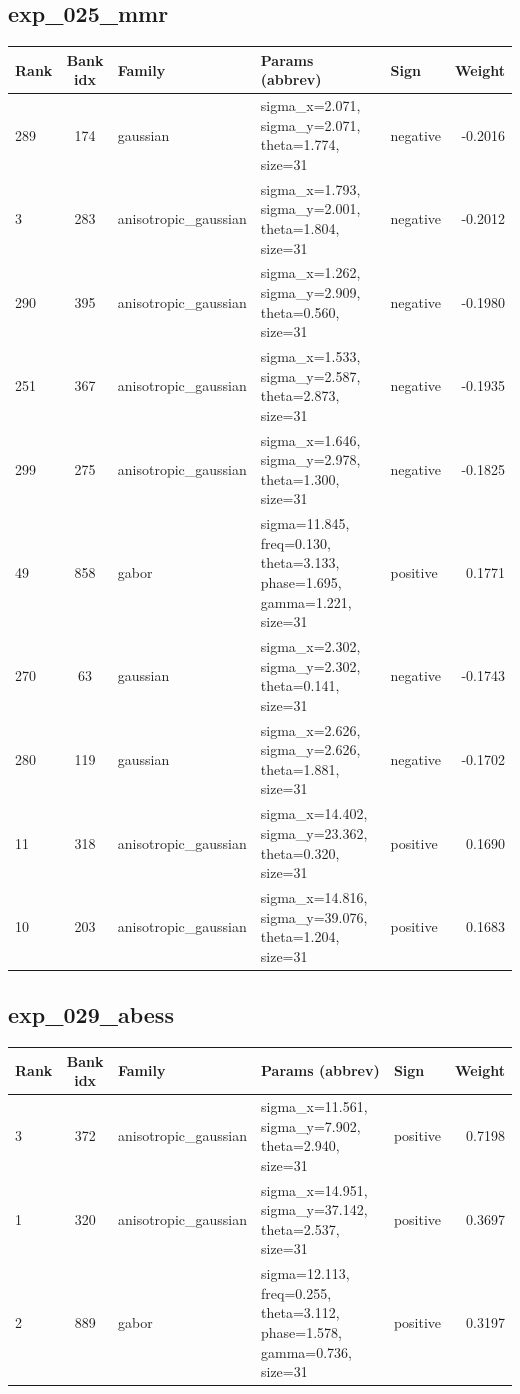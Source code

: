 \documentclass{article}
\begin{document}
\subsection*{exp\_025\_mmr}
\begin{center}
\begin{tabular}{lclllr}
\toprule
Rank & Bank idx & Family & Params (abbrev) & Sign & Weight \\
\midrule

289 & 174 & gaussian & sigma\_x=2.071, sigma\_y=2.071, theta=1.774, size=31 & negative & -0.2016 \\
3 & 283 & anisotropic\_gaussian & sigma\_x=1.793, sigma\_y=2.001, theta=1.804, size=31 & negative & -0.2012 \\
290 & 395 & anisotropic\_gaussian & sigma\_x=1.262, sigma\_y=2.909, theta=0.560, size=31 & negative & -0.1980 \\
251 & 367 & anisotropic\_gaussian & sigma\_x=1.533, sigma\_y=2.587, theta=2.873, size=31 & negative & -0.1935 \\
299 & 275 & anisotropic\_gaussian & sigma\_x=1.646, sigma\_y=2.978, theta=1.300, size=31 & negative & -0.1825 \\
49 & 858 & gabor & sigma=11.845, freq=0.130, theta=3.133, phase=1.695, gamma=1.221, size=31 & positive & 0.1771 \\
270 & 63 & gaussian & sigma\_x=2.302, sigma\_y=2.302, theta=0.141, size=31 & negative & -0.1743 \\
280 & 119 & gaussian & sigma\_x=2.626, sigma\_y=2.626, theta=1.881, size=31 & negative & -0.1702 \\
11 & 318 & anisotropic\_gaussian & sigma\_x=14.402, sigma\_y=23.362, theta=0.320, size=31 & positive & 0.1690 \\
10 & 203 & anisotropic\_gaussian & sigma\_x=14.816, sigma\_y=39.076, theta=1.204, size=31 & positive & 0.1683 \\
\bottomrule
\end{tabular}
\end{center}

\subsection*{exp\_029\_abess}
\begin{center}
\begin{tabular}{lclllr}
\toprule
Rank & Bank idx & Family & Params (abbrev) & Sign & Weight \\
\midrule

3 & 372 & anisotropic\_gaussian & sigma\_x=11.561, sigma\_y=7.902, theta=2.940, size=31 & positive & 0.7198 \\
1 & 320 & anisotropic\_gaussian & sigma\_x=14.951, sigma\_y=37.142, theta=2.537, size=31 & positive & 0.3697 \\
2 & 889 & gabor & sigma=12.113, freq=0.255, theta=3.112, phase=1.578, gamma=0.736, size=31 & positive & 0.3197 \\
\bottomrule
\end{tabular}
\end{center}
\end{document}
